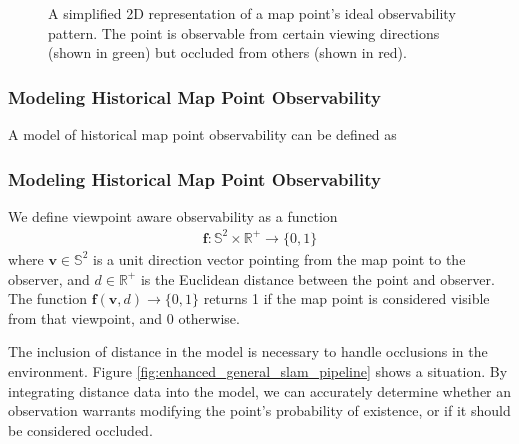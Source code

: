 \begin{figure}[!ht]
    \centering
    \caption{A simplified 2D representation of a map point's ideal observability pattern. The point is observable from certain viewing directions (shown in green) but occluded from others (shown in red).}
    \label{fig:2d_observability}
\end{figure}

\subsubsection{Modeling Historical Map Point Observability}

A model of historical map point observability can be defined as
$$

$$

\subsubsection{Modeling Historical Map Point Observability}
\label{sec:observability_models}

We define viewpoint aware observability as a function
\begin{align*}
    \boldsymbol{f:}\mathbb{S}^2\times\mathbb{R}^+\rightarrow\{0,1\}
\end{align*}
where $\mathbf{v}\in\mathbb{S}^2$ is a unit direction vector pointing from the map point to the observer, and $d\in\mathbb{R}^+$ is the Euclidean distance between the point and observer. The function $\boldsymbol{f}(\mathbf{v}, d)\rightarrow\{0,1\}$ returns 1 if the map point is considered visible from that viewpoint, and 0 otherwise.


The inclusion of distance in the model is necessary to handle occlusions in the environment. Figure \ref{fig:enhanced_general_slam_pipeline} shows a situation. By integrating distance data into the model, we can accurately determine whether an observation warrants modifying the point's probability of existence, or if it should be considered occluded.


